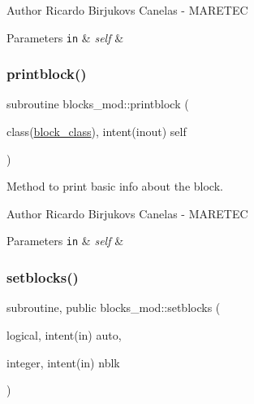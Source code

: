 \begin{DoxyAuthor}{Author}
Ricardo Birjukovs Canelas -\/ M\+A\+R\+E\+T\+EC 
\end{DoxyAuthor}

\begin{DoxyParams}[1]{Parameters}
\mbox{\tt in}  & {\em self} & \\
\hline
\end{DoxyParams}
\mbox{\label{namespaceblocks__mod_a6eab8b323cb15dcecb5c6b0c31b4e246}} 
\subsubsection{\texorpdfstring{printblock()}{printblock()}}
{\footnotesize\ttfamily subroutine blocks\+\_\+mod\+::printblock (\begin{DoxyParamCaption}\item[{class(\hyperlink{structblocks__mod_1_1block__class}{block\+\_\+class}), intent(inout)}]{self }\end{DoxyParamCaption})\hspace{0.3cm}{\ttfamily [private]}}



Method to print basic info about the block. 

\begin{DoxyAuthor}{Author}
Ricardo Birjukovs Canelas -\/ M\+A\+R\+E\+T\+EC 
\end{DoxyAuthor}

\begin{DoxyParams}[1]{Parameters}
\mbox{\tt in}  & {\em self} & \\
\hline
\end{DoxyParams}
\mbox{\label{namespaceblocks__mod_a3312d23e0268d67aaf99d579aa57d0e7}} 
\subsubsection{\texorpdfstring{setblocks()}{setblocks()}}
{\footnotesize\ttfamily subroutine, public blocks\+\_\+mod\+::setblocks (\begin{DoxyParamCaption}\item[{logical, intent(in)}]{auto,  }\item[{integer, intent(in)}]{nblk }\end{DoxyParamCaption})}



